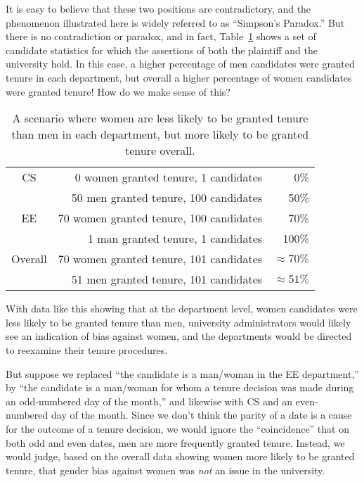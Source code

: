 \begin{editingnotes}
It is easy to believe that these two positions are contradictory, and
the phenomenon illustrated here is widely referred to as ``Simpson's
Paradox.''  But there is no contradiction or paradox, and in fact,
Table~\ref{fig:15D3} shows a set of candidate statistics for which the
assertions of both the plaintiff and the university hold.  In this
case, a higher percentage of men candidates were granted tenure in
each department, but overall a higher percentage of women candidates
were granted tenure!  How do we make sense of this?

\begin{table}

\begin{tabular}{crr}
CS & 0 women granted tenure, 1 candidates      &   0\% \\
   & 50 men granted tenure, 100 candidates     &  50\% \\
EE & 70 women granted tenure, 100 candidates   &  70\% \\
   & 1 man granted tenure, 1 candidates         & 100\% \\
\hline
Overall & 70 women granted tenure, 101 candidates & $\approx 70\%$ \\
        & 51 men granted tenure, 101 candidates   & $\approx 51\%$
\end{tabular}

\caption{A scenario where women are less likely to be granted tenure
  than men in each department, but more likely to be granted tenure
  overall.}

\label{fig:15D3}

\end{table}

With data like this showing that at the department level, women
candidates were less likely to be granted tenure than men, university
administrators would likely see an indication of bias against women,
and the departments would be directed to reexamine their tenure
procedures.

But suppose we replaced ``the candidate is a man/woman in the EE
department,'' by ``the candidate is a man/woman for whom a tenure
decision was made during an odd-numbered day of the month,'' and
likewise with CS and an even-numbered day of the month.  Since we
don't think the parity of a date is a cause for the outcome of a
tenure decision, we would ignore the ``coincidence'' that on both odd
and even dates, men are more frequently granted tenure.  Instead, we
would judge, based on the overall data showing women more likely to be
granted tenure, that gender bias against women was \emph{not} an issue
in the university.


\end{editingnotes}
